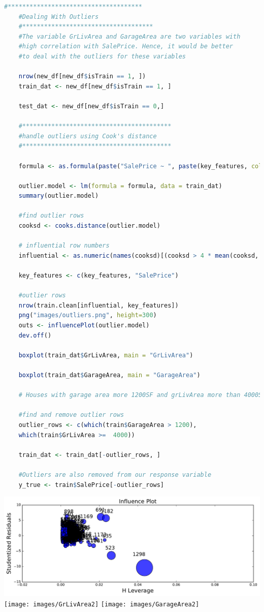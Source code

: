\documentclass[sigconf]{acmart}
\begin{document}
	\begin{lstlisting}[language=R]
	#*************************************
	#Dealing With Outliers
	#************************************
	#The variable GrLivArea and GarageArea are two variables with 
	#high correlation with SalePrice. Hence, it would be better 
	#to deal with the outliers for these variables
	
	nrow(new_df[new_df$isTrain == 1, ])
	train_dat <- new_df[new_df$isTrain == 1, ]
	
	test_dat <- new_df[new_df$isTrain == 0,]
	
	#*****************************************
	#handle outliers using Cook's distance
	#*****************************************
	
	formula <- as.formula(paste("SalePrice ~ ", paste(key_features, collapse="+")))
	
	outlier.model <- lm(formula = formula, data = train_dat)
	summary(outlier.model)
	
	#find outlier rows
	cooksd <- cooks.distance(outlier.model)
	
	# influential row numbers
	influential <- as.numeric(names(cooksd)[(cooksd > 4 * mean(cooksd, na.rm=T))])  
	
	key_features <- c(key_features, "SalePrice")
	
	#outlier rows
	nrow(train.clean[influential, key_features])
	png("images/outliers.png", height=300)
	outs <- influencePlot(outlier.model)
	dev.off()
	
	boxplot(train_dat$GrLivArea, main = "GrLivArea")
	
	boxplot(train_dat$GarageArea, main = "GarageArea")
	
	# Houses with garage area more 1200SF and grLivArea more than 4000SF are removed because they are gargantuan and their presence is adding skewness to the data.
	
	#find and remove outlier rows
	outlier_rows <- c(which(train$GarageArea > 1200),
	which(train$GrLivArea >=  4000))
	
	train_dat <- train_dat[-outlier_rows, ]
	
	#Outliers are also removed from our response variable
	y_true <- train$SalePrice[-outlier_rows]
	\end{lstlisting}
	
	\begin{center}
		\includegraphics[width=0.99\columnwidth]{images/outliers}		
		\texttt{[image: images/GrLivArea2]}		
		\texttt{[image: images/GarageArea2]}
	\end{center}
	
\end{document}
